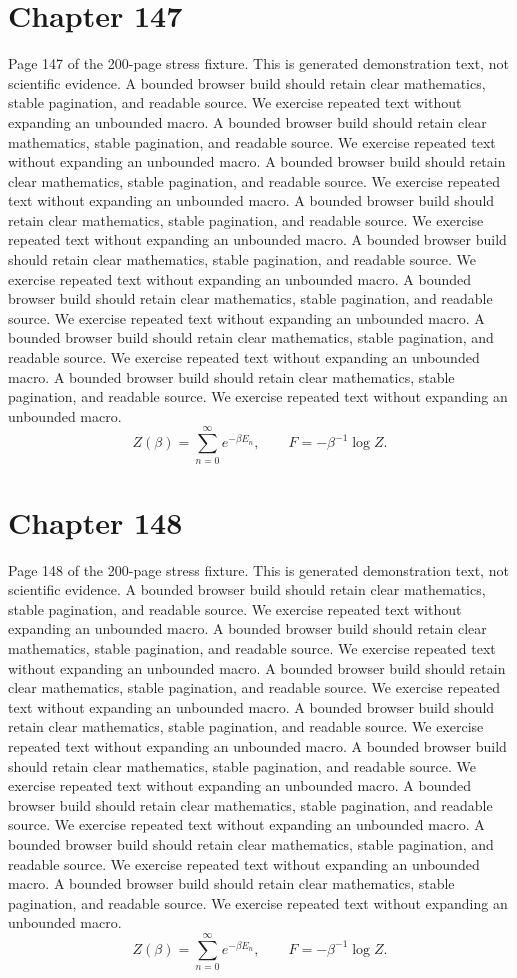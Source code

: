 \documentclass[11pt]{article}
\begin{document}
\section*{Chapter 147}
Page 147 of the 200-page stress fixture. This is generated demonstration text, not scientific evidence.
A bounded browser build should retain clear mathematics, stable pagination, and readable source. We exercise repeated text without expanding an unbounded macro.
A bounded browser build should retain clear mathematics, stable pagination, and readable source. We exercise repeated text without expanding an unbounded macro.
A bounded browser build should retain clear mathematics, stable pagination, and readable source. We exercise repeated text without expanding an unbounded macro.
A bounded browser build should retain clear mathematics, stable pagination, and readable source. We exercise repeated text without expanding an unbounded macro.
A bounded browser build should retain clear mathematics, stable pagination, and readable source. We exercise repeated text without expanding an unbounded macro.
A bounded browser build should retain clear mathematics, stable pagination, and readable source. We exercise repeated text without expanding an unbounded macro.
A bounded browser build should retain clear mathematics, stable pagination, and readable source. We exercise repeated text without expanding an unbounded macro.
A bounded browser build should retain clear mathematics, stable pagination, and readable source. We exercise repeated text without expanding an unbounded macro.
\[Z(\beta)=\sum_{n=0}^{\infty}e^{-\beta E_n},\qquad F=-\beta^{-1}\log Z.\]
\newpage
\section*{Chapter 148}
Page 148 of the 200-page stress fixture. This is generated demonstration text, not scientific evidence.
A bounded browser build should retain clear mathematics, stable pagination, and readable source. We exercise repeated text without expanding an unbounded macro.
A bounded browser build should retain clear mathematics, stable pagination, and readable source. We exercise repeated text without expanding an unbounded macro.
A bounded browser build should retain clear mathematics, stable pagination, and readable source. We exercise repeated text without expanding an unbounded macro.
A bounded browser build should retain clear mathematics, stable pagination, and readable source. We exercise repeated text without expanding an unbounded macro.
A bounded browser build should retain clear mathematics, stable pagination, and readable source. We exercise repeated text without expanding an unbounded macro.
A bounded browser build should retain clear mathematics, stable pagination, and readable source. We exercise repeated text without expanding an unbounded macro.
A bounded browser build should retain clear mathematics, stable pagination, and readable source. We exercise repeated text without expanding an unbounded macro.
A bounded browser build should retain clear mathematics, stable pagination, and readable source. We exercise repeated text without expanding an unbounded macro.
\[Z(\beta)=\sum_{n=0}^{\infty}e^{-\beta E_n},\qquad F=-\beta^{-1}\log Z.\]
\newpage
\end{document}
